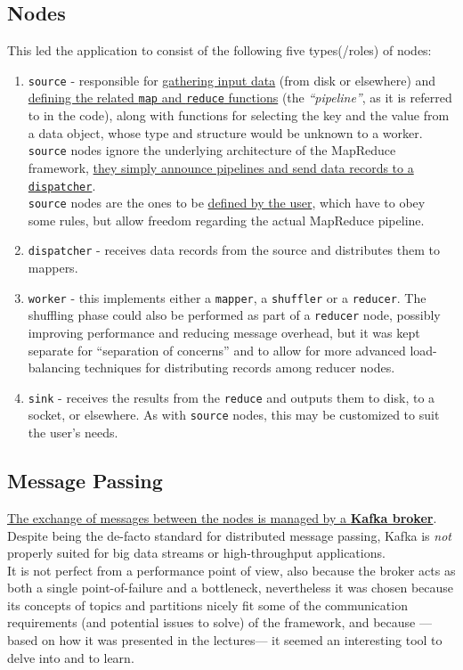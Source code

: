 \subsection{Nodes}
This led the application to consist of the following five types(/roles) of nodes:
\begin{enumerate}
   \item \texttt{source} - responsible for \ul{gathering input data} (from disk or elsewhere) and \ul{defining the related \texttt{map} and \texttt{reduce} functions} (the \textit{``pipeline''}, as it is referred to in the code), along with functions for selecting the key and the value from a data object, whose type and structure would be unknown to a worker.\\
   \texttt{source} nodes ignore the underlying architecture of the MapReduce framework, \ul{they simply announce pipelines and send data records to a \texttt{dispatcher}}.\\
   \texttt{source} nodes are the ones to be \ul{defined by the user}, which have to obey some rules, but allow freedom regarding the actual MapReduce pipeline.
   \item \texttt{dispatcher} - receives data records from the source and distributes them to mappers.
   \item \texttt{worker} - this implements either a \texttt{mapper}, a \texttt{shuffler} or a \texttt{reducer}. The shuffling phase could also be performed as part of a \texttt{reducer} node, possibly improving performance and reducing message overhead, but it was kept separate for ``separation of concerns'' and to allow for more advanced load-balancing techniques for distributing records among reducer nodes.
   \item \texttt{sink} - receives the results from the \texttt{reduce} and outputs them to disk, to a socket, or elsewhere. As with \texttt{source} nodes, this may be customized to suit the user's needs.
\end{enumerate}

\subsection{Message Passing}
\ul{The exchange of messages between the nodes is managed by a \textbf{Kafka broker}}. 
Despite being the de-facto standard for distributed message passing, Kafka is \textit{not} properly suited for big data streams or high-throughput applications.\\
It is not perfect from a performance point of view, also because the broker acts as both a single point-of-failure and a bottleneck, nevertheless it was chosen because its concepts of topics and partitions nicely fit some of the communication requirements (and potential issues to solve) of the framework, and because ---based on how it was presented in the lectures--- it seemed an interesting tool to delve into and to learn.


